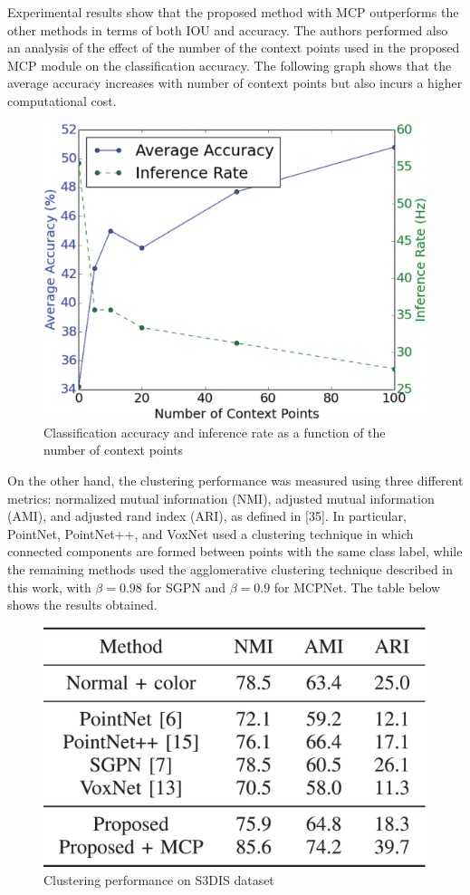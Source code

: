 Experimental results show that the proposed method with MCP outperforms
the other methods in terms of both IOU and accuracy. The authors
performed also an analysis of the effect of the number of the context
points used in the proposed MCP module on the classification accuracy.
The following graph shows that the average accuracy increases with
number of context points but also incurs a higher computational cost.
\newpage
\begin{figure}[h!]
\centering
\includegraphics[width=0.7\linewidth]{images/MCPpoints.png}
\caption{Classification accuracy and inference rate as a function of the number of context points}
\end{figure}

On the other hand, the clustering performance was measured using three
different metrics: normalized mutual information (NMI), adjusted mutual
information (AMI), and adjusted rand index (ARI), as defined in
{[}35{]}. In particular, PointNet, PointNet++, and VoxNet used a
clustering technique in which connected components are formed between
points with the same class label, while the remaining methods used the
agglomerative clustering technique described in this work, with
$\beta = 0.98$ for SGPN and $\beta = 0.9$ for MCPNet. The table
below shows the results obtained.

\begin{figure}[h!]
\centering
\includegraphics[width=0.65\linewidth]{images/clusper.png}
\caption{Clustering performance on S3DIS dataset}
\end{figure}

